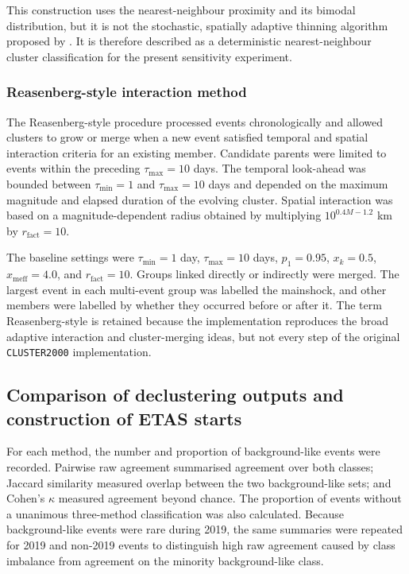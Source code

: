 This construction uses the nearest-neighbour proximity and its bimodal
distribution, but it is not the stochastic, spatially adaptive thinning
algorithm proposed by \citet{zaliapin2020declustering}. It is therefore
described as a deterministic nearest-neighbour cluster classification for the
present sensitivity experiment.

\subsubsection{Reasenberg-style interaction method}

The Reasenberg-style procedure processed events chronologically and allowed
clusters to grow or merge when a new event satisfied temporal and spatial
interaction criteria for an existing member. Candidate parents were limited
to events within the preceding $\tau_{\max}=10$ days. The temporal look-ahead
was bounded between $\tau_{\min}=1$ and $\tau_{\max}=10$ days and depended on
the maximum magnitude and elapsed duration of the evolving cluster. Spatial
interaction was based on a magnitude-dependent radius obtained by multiplying
$10^{0.4M-1.2}$ km by $r_{\mathrm{fact}}=10$.

The baseline settings were $\tau_{\min}=1$ day, $\tau_{\max}=10$ days,
$p_1=0.95$, $x_k=0.5$, $x_{\mathrm{meff}}=4.0$, and
$r_{\mathrm{fact}}=10$. Groups linked directly or indirectly were merged.
The largest event in each multi-event group was labelled the mainshock, and
other members were labelled by whether they occurred before or after it.
The term Reasenberg-style is retained because the implementation reproduces
the broad adaptive interaction and cluster-merging ideas, but not every step
of the original \texttt{CLUSTER2000} implementation.

\subsection{Comparison of declustering outputs and construction of ETAS starts}
\label{sec:declustering_comparison}

For each method, the number and proportion of background-like events were
recorded. Pairwise raw agreement summarised agreement over both classes;
Jaccard similarity measured overlap between the two background-like sets; and
Cohen's $\kappa$ measured agreement beyond chance. The proportion of events
without a unanimous three-method classification was also calculated. Because
background-like events were rare during 2019, the same summaries were
repeated for 2019 and non-2019 events to distinguish high raw agreement caused
by class imbalance from agreement on the minority background-like class.

